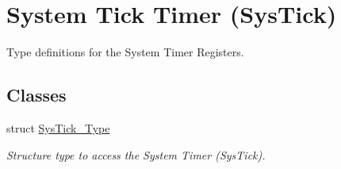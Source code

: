 \hypertarget{group___c_m_s_i_s___sys_tick}{\section{System Tick Timer (Sys\-Tick)}
\label{group___c_m_s_i_s___sys_tick}
}


Type definitions for the System Timer Registers.  


\subsection*{Classes}
\begin{DoxyCompactItemize}
\item 
struct \hyperlink{struct_sys_tick___type}{Sys\-Tick\-\_\-\-Type}
\begin{DoxyCompactList}\small\item\em Structure type to access the System Timer (Sys\-Tick). \end{DoxyCompactList}\end{DoxyCompactItemize}
